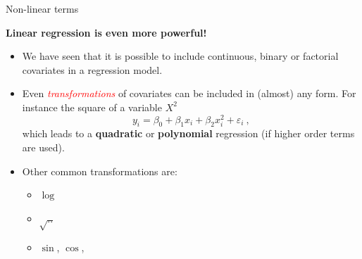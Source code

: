 \documentclass[
  10pt,
  ignorenonframetext,
]{beamer}
\providecommand{\tightlist}{%
  \setlength{\itemsep}{0pt}\setlength{\parskip}{0pt}}
\begin{document}
\begin{frame}
\begin{block}{Non-linear terms}
\protect\hypertarget{non-linear-terms}{}
\vspace{2mm}

\textbf{Linear regression is even more powerful!} \vspace{2mm}

\begin{itemize}
\tightlist
\item
  We have seen that it is possible to include continuous, binary or
  factorial covariates in a regression model.
\end{itemize}

\vspace{2mm}

\begin{itemize}
\tightlist
\item
  Even \emph{\textcolor{red}{transformations}} of covariates can be
  included in (almost) any form. For instance the square of a variable
  \(X^2\) \begin{equation*}
  y_i = \beta_0 + \beta_1 x_i + \beta_2 x_i^2 + \varepsilon_i \ , 
  \end{equation*} which leads to a \textbf{quadratic} or
  \textbf{polynomial} regression (if higher order terms are used).
\end{itemize}

\vspace{4mm}

\begin{itemize}
\tightlist
\item
  Other common transformations are:

  \begin{itemize}
  \tightlist
  \item
    \(\log\)
  \item
    \(\sqrt{..}\)
  \item
    \(\sin\), \(\cos\),
  \end{itemize}
\end{itemize}
\end{block}
\end{frame}
\end{document}
